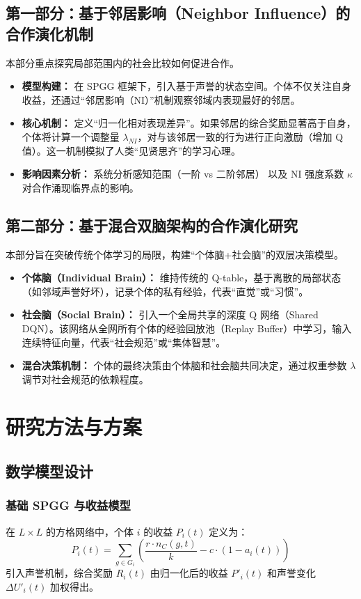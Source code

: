 \documentclass[UTF8,a4paper,12pt]{ctexart}
\begin{document}
\subsection{第一部分：基于邻居影响（Neighbor Influence）的合作演化机制}
本部分重点探究局部范围内的社会比较如何促进合作。
\begin{itemize}
    \item \textbf{模型构建：} 在 SPGG 框架下，引入基于声誉的状态空间。个体不仅关注自身收益，还通过“邻居影响（NI）”机制观察邻域内表现最好的邻居。
    \item \textbf{核心机制：} 定义“归一化相对表现差异”。如果邻居的综合奖励显著高于自身，个体将计算一个调整量 $\lambda_{NI}$，对与该邻居一致的行为进行正向激励（增加 Q 值）。这一机制模拟了人类“见贤思齐”的学习心理。
    \item \textbf{影响因素分析：} 系统分析感知范围（一阶 vs 二阶邻居）\cite{xia2012} 以及 NI 强度系数 $\kappa$ 对合作涌现临界点的影响。
\end{itemize}

\subsection{第二部分：基于混合双脑架构的合作演化研究}
本部分旨在突破传统个体学习的局限，构建“个体脑+社会脑”的双层决策模型。
\begin{itemize}
    \item \textbf{个体脑（Individual Brain）：} 维持传统的 Q-table，基于离散的局部状态（如邻域声誉好坏），记录个体的私有经验，代表“直觉”或“习惯”。
    \item \textbf{社会脑（Social Brain）：} 引入一个全局共享的深度 Q 网络（Shared DQN）。该网络从全网所有个体的经验回放池（Replay Buffer）中学习，输入连续特征向量，代表“社会规范”或“集体智慧”。
    \item \textbf{混合决策机制：} 个体的最终决策由个体脑和社会脑共同决定，通过权重参数 $\lambda$ 调节对社会规范的依赖程度。
\end{itemize}

\section{研究方法与方案}

\subsection{数学模型设计}

\subsubsection{基础 SPGG 与收益模型}
在 $L \times L$ 的方格网络中，个体 $i$ 的收益 $P_i(t)$ 定义为：
\begin{equation}
P_i(t) = \sum_{g \in G_i} \left( \frac{r \cdot n_C(g, t)}{k} - c \cdot (1 - a_i(t))\right)
\end{equation}
引入声誉机制，综合奖励 $R_i(t)$ 由归一化后的收益 $P'_i(t)$ 和声誉变化 $\Delta U'_i(t)$ 加权得出。
\end{document}
